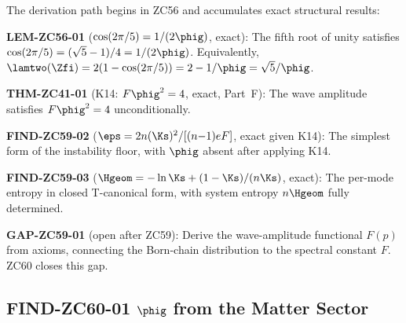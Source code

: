 \documentclass[12pt, a4paper]{article}
\begin{document}
\begin{keybox}[title={The ZC55--ZC59 Chain that Reaches ZC60}]
The derivation path begins in ZC56 and accumulates exact
structural results:

\medskip
\textbf{LEM-ZC56-01} ($\cos(2\pi/5)=1/(2\phig)$, exact):
The fifth root of unity satisfies $\cos(2\pi/5)=({\sqrt{5}-1})/4
= 1/(2\phig)$.  Equivalently,
$\lamtwo(\Zfi) = 2(1-\cos(2\pi/5)) = 2-1/\phig = \sqrt{5}/\phig$.

\medskip
\textbf{THM-ZC41-01} (K14: $F\phig^2=4$, exact, Part~F):
The wave amplitude satisfies $F\phig^2=4$ unconditionally.

\medskip
\textbf{FIND-ZC59-02} ($\eps=2n(\Ks)^2/[(n{-}1)eF]$,
exact given K14): The simplest form of the instability floor,
with $\phig$ absent after applying K14.

\medskip
\textbf{FIND-ZC59-03} ($\Hgeom=-\ln\Ks+(1-\Ks)/(n\Ks)$,
exact): The per-mode entropy in closed T-canonical form,
with system entropy $n\Hgeom$ fully determined.

\medskip
\textbf{GAP-ZC59-01} (open after ZC59):
Derive the wave-amplitude functional $F(p)$ from axioms,
connecting the Born-chain distribution to the spectral
constant $F$.  ZC60 closes this gap.
\end{keybox}

\subsection{FIND-ZC60-01 \quad $\phig$ from the Matter Sector}
\label{sec:find01}

\end{document}
